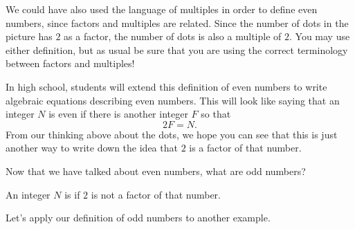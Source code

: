 \documentclass{ximera}
\begin{document}
We could have also used the language of multiples in order to define even numbers, since factors and multiples are related. Since the number of dots in the picture has $2$ as a factor, the number of dots is also a multiple of $2$. You may use either definition, but as usual be sure that you are using the correct terminology between factors and multiples!

In high school, students will extend this definition of even numbers to write algebraic equations describing even numbers. This will look like saying that an integer $N$ is even if there is another integer $F$ so that
\[
2F = N.
\]
From our thinking above about the dots, we hope you can see that this is just another way to write down the idea that $2$ is a factor of that number.

Now that we have talked about even numbers, what are odd numbers?

\begin{definition}
An integer $N$ is  if $2$ is not a factor of that number.
\end{definition}

Let's apply our definition of odd numbers to another example.
\end{document}
